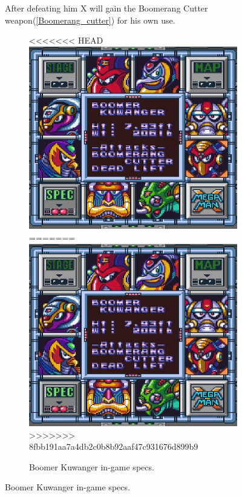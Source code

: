 \begin{figure}[htp]
After defeating him X will gain the Boomerang Cutter weapon(\ref{Boomerang_cutter}) for his own use.
\begin{figure}[htp]
	\centering
<<<<<<< HEAD
	\includegraphics[width=0.4\linewidth]{figures/X1/Boomer_kuwanger/Boomer_kuwanger_specs.png}
=======
	\includegraphics[width=0.5\linewidth]{figures/X1/Boomer_kuwanger_specs.png}
>>>>>>> 8fbb191aa7a4db2c0b8b92aaf47c931676d899b9
	\caption{Boomer Kuwanger in-game specs.}
\end{figure}


\end{figure}
